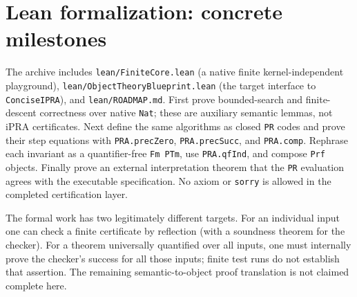 \documentclass[11pt]{article}
\begin{document}
\section{Lean formalization: concrete milestones}
The archive includes \texttt{lean/FiniteCore.lean} (a native finite kernel-independent playground), \texttt{lean/ObjectTheoryBlueprint.lean} (the target interface to \texttt{ConciseIPRA}), and \texttt{lean/ROADMAP.md}. First prove bounded-search and finite-descent correctness over native \texttt{Nat}; these are auxiliary semantic lemmas, not iPRA certificates. Next define the same algorithms as closed \texttt{PR} codes and prove their step equations with \texttt{PRA.precZero}, \texttt{PRA.precSucc}, and \texttt{PRA.comp}. Rephrase each invariant as a quantifier-free \texttt{Fm PTm}, use \texttt{PRA.qfInd}, and compose \texttt{Prf} objects. Finally prove an external interpretation theorem that the \texttt{PR} evaluation agrees with the executable specification. No axiom or \texttt{sorry} is allowed in the completed certification layer.

The formal work has two legitimately different targets. For an individual input one can check a finite certificate by reflection (with a soundness theorem for the checker). For a theorem universally quantified over all inputs, one must internally prove the checker's success for all those inputs; finite test runs do not establish that assertion. The remaining semantic-to-object proof translation is not claimed complete here.
\end{document}
